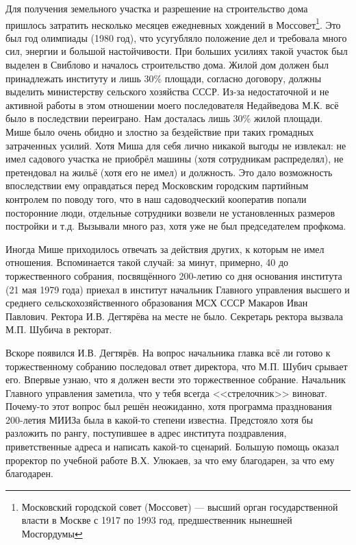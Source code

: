 Для получения земельного участка и разрешение на строительство дома пришлось затратить несколько месяцев ежедневных хождений в Моссовет\footnote{Московский городской совет (Моссовет) — высший орган государственной власти в Москве с 1917 по 1993 год, предшественник нынешней Мосгордумы}. Это был год олимпиады (1980 год), что усугубляло положение дел и требовала много сил, энергии и большой настойчивости. При больших усилиях такой участок был выделен в Свиблово и началось строительство дома. Жилой дом должен был принадлежать институту и лишь 30\% площади, согласно договору, должны выделить министерству сельского хозяйства СССР. Из-за недостаточной и не активной работы в этом отношении моего последователя Недайведова М.К. всё было в последствии переиграно. Нам досталась лишь 30\% жилой площади. Мише было очень обидно и злостно за бездействие при таких громадных затраченных усилий. Хотя Миша для себя лично никакой выгоды не извлекал: не имел садового участка не приобрёл машины (хотя сотрудникам распределял), не претендовал на жильё (хотя его не имел) и должность. Это дало возможность впоследствии ему оправдаться перед Московским городским партийным контролем по поводу того, что в наш садоводческий кооператив попали посторонние люди, отдельные сотрудники возвели не установленных размеров постройки и т.д. Вызывали много раз, хотя уже не был председателем профкома.

Иногда Мише приходилось отвечать за действия других, к которым не имел отношения. Вспоминается такой случай: за минут, примерно, 40 до торжественного собрания, посвящённого 200-летию со дня основания института (21 мая 1979 года) приехал в институт начальник Главного управления высшего и среднего сельскохозяйственного образования МСХ СССР Макаров Иван Павлович. Ректора И.В. Дегтярёва на месте не было. Секретарь ректора вызвала М.П. Шубича в ректорат.

Вскоре появился И.В. Дегтярёв. На вопрос начальника главка всё ли готово к торжественному собранию последовал ответ директора, что М.П. Шубич срывает его. Впервые узнаю, что я должен вести это торжественное собрание. Начальник Главного управления заметила, что у тебя всегда <<стрелочник>> виноват. Почему-то этот вопрос был решён неожиданно, хотя программа празднования 200-летия МИИЗа была в какой-то степени известна. Предстояло хотя бы разложить по рангу, поступившее в адрес института поздравления, приветственные адреса и написать какой-то сценарий. Большую помощь оказал проректор по учебной работе В.Х. Улюкаев, за что ему благодарен, за что ему благодарен.

